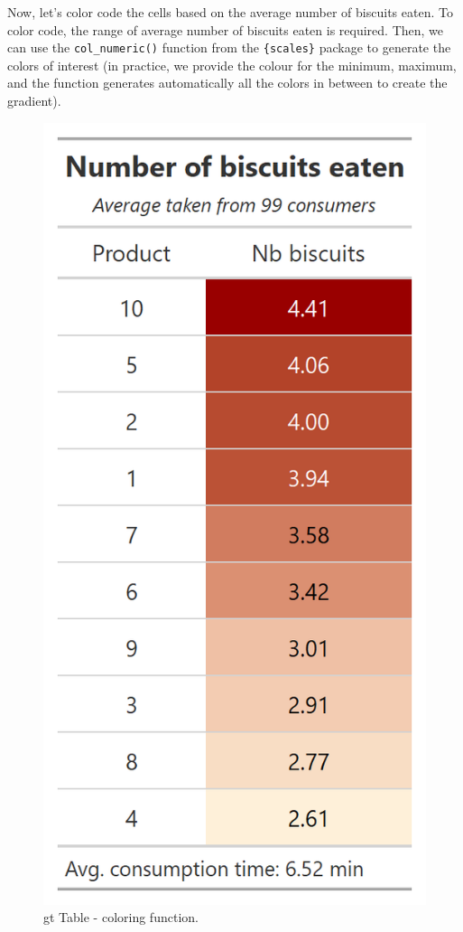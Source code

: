 \documentclass[
]{krantz}
\makeatletter
\newenvironment{Shaded}{\begin{snugshade}}{\end{snugshade}}
\newcommand{\AttributeTok}[1]{\textcolor[rgb]{0.61,0.61,0.61}{#1}}
\newcommand{\FloatTok}[1]{\textcolor[rgb]{0.06,0.06,0.06}{#1}}
\newcommand{\FunctionTok}[1]{\textcolor[rgb]{0,0,0}{#1}}
\newcommand{\NormalTok}[1]{#1}
\newcommand{\OtherTok}[1]{\textcolor[rgb]{0.37,0.37,0.37}{#1}}
\newcommand{\SpecialCharTok}[1]{\textcolor[rgb]{0,0,0}{#1}}
\newcommand{\StringTok}[1]{\textcolor[rgb]{0.5,0.5,0.5}{#1}}
\newenvironment{kframe}{%
\medskip{}
\setlength{\fboxsep}{.8em}
 \def\at@end@of@kframe{}%
 \ifinner\ifhmode%
  \def\at@end@of@kframe{\end{minipage}}%
  \begin{minipage}{\columnwidth}%
 \fi\fi%
 \def\FrameCommand##1{\hskip\@totalleftmargin \hskip-\fboxsep
 \colorbox{shadecolor}{##1}\hskip-\fboxsep
     \hskip-\linewidth \hskip-\@totalleftmargin \hskip\columnwidth}%
 \MakeFramed {\advance\hsize-\width
   \@totalleftmargin\z@ \linewidth\hsize
   \@setminipage}}%
 {\par\unskip\endMakeFramed%
 \at@end@of@kframe}
\renewenvironment{Shaded}{\begin{kframe}}{\end{kframe}}
\makeatother
\begin{document}
Now, let's color code the cells based on the average number of biscuits eaten. To color code, the range of average number of biscuits eaten is required. Then, we can use the \texttt{col\_numeric()} function from the \texttt{\{scales\}} package to generate the colors of interest (in practice, we provide the colour for the minimum, maximum, and the function generates automatically all the colors in between to create the gradient).

\begin{Shaded}
\end{Shaded}

\begin{figure}

{\centering \includegraphics[width=0.3\linewidth]{images/gt_table_2} 

}

\caption{gt Table - coloring function.}\label{fig:gttabledesigned}
\end{figure}
\end{document}
